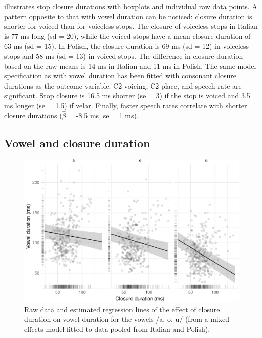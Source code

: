 \documentclass[preprint]{JASAnew}
\begin{document}
 illustrates stop closure durations with boxplots
and individual raw data points. A pattern opposite to that with vowel
duration can be noticed: closure duration is shorter for voiced than for
voiceless stops. The closure of voiceless stops in Italian is 77 ms long
(sd = 20), while the voiced stops have a mean closure duration of 63 ms
(sd = 15). In Polish, the closure duration is 69 ms (sd = 12) in
voiceless stops and 58 ms (sd = 13) in voiced stops. The difference in
closure duration based on the raw means is 14 ms in Italian and 11 ms in
Polish. The same model specification as with vowel duration has been
fitted with consonant closure durations as the outcome variable. C2
voicing, C2 place, and speech rate are significant. Stop closure is 16.5
ms shorter (se = 3) if the stop is voiced and 3.5 ms longer (se = 1.5)
if velar. Finally, faster speech rates correlate with shorter closure
durations (\(\hat{\beta}\) = -8.5 ms, se = 1 ms).

\hypertarget{vowel-and-closure-duration}{%
\subsection{Vowel and closure
duration}\label{vowel-and-closure-duration}}

\begin{figure}
\includegraphics[width=\linewidth]{2018-jasa_files/figure-latex/vow-clo-plot-1} \caption{Raw data and estimated regression lines of the effect of closure duration on vowel duration for the vowels /a, o, u/ (from a mixed-effects model fitted to data pooled from Italian and Polish).}\label{f:vow-clo-plot}
\end{figure}
\end{document}
